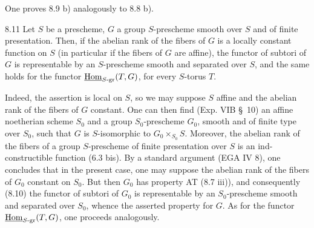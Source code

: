 One proves 8.9 b) analogously to 8.8 b).
\begin{corollary}{8.11}\label{XV.8.11}
Let $S$ be a prescheme, $G$ a group $S$-prescheme smooth over $S$ and of finite presentation. Then, if the abelian rank of the fibers of $G$ is a locally constant function on $S$ (in particular if the fibers of $G$ are affine), the functor of subtori of $G$ is representable by an $S$-prescheme smooth and separated over $S$, and the same holds for the functor $\underline{\operatorname{Hom}}_{S\text{-gr}}(T,G)$, for every $S$-torus $T$.
\end{corollary}
Indeed, the assertion is local on $S$, so we may suppose $S$ affine and the abelian rank of the fibers of $G$ constant. One can then find (Exp. VIB \S\ 10) an affine noetherian scheme $S_0$ and a group $S_0$-prescheme $G_0$, smooth and of finite type over $S_0$, such that $G$ is $S$-isomorphic to $G_0\times_{S_0}S$. Moreover, the abelian rank of the fibers of a group $S$-prescheme of finite presentation over $S$ is an ind-constructible function (6.3 bis). By a standard argument (EGA IV 8), one concludes that in the present case, one may suppose the abelian rank of the fibers of $G_0$ constant on $S_0$. But then $G_0$ has property AT (8.7 iii)), and consequently (8.10) the functor of subtori of $G_0$ is representable by an $S_0$-prescheme smooth and separated over $S_0$, whence the asserted property for $G$. As for the functor $\underline{\operatorname{Hom}}_{S\text{-gr}}(T,G)$, one proceeds analogously.

